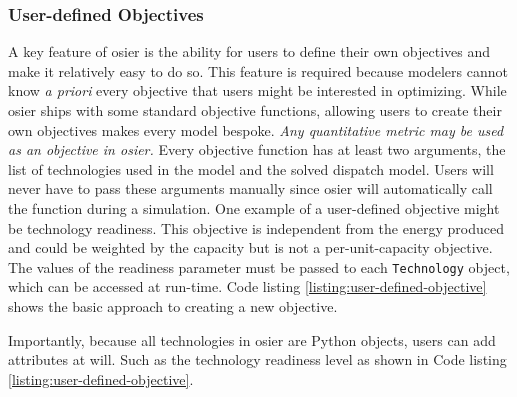 \subsubsection{User-defined Objectives}

A key feature of \ac{osier} is the ability for users to define their own
objectives and make it relatively easy to do so. This feature is required
because modelers cannot know \textit{a priori} every objective that users might
be interested in optimizing. While \ac{osier} ships with some standard objective
functions, allowing users to create their own objectives makes every model
bespoke. \textit{Any quantitative metric may be used as an objective in
\ac{osier}.} Every objective function has at least two arguments, the list of
technologies used in the model and the solved dispatch model. Users will never
have to pass these arguments manually since \ac{osier} will automatically call
the function during a simulation. One example of a user-defined objective might
be technology readiness. This objective is independent from the energy produced
and could be weighted by the capacity but is not a per-unit-capacity objective.
The values of the readiness parameter must be passed to each \texttt{Technology}
object, which can be accessed at run-time. Code listing
\ref{listing:user-defined-objective} shows the basic approach to creating a new
objective. 

\noindent
Importantly, because all technologies in \ac{osier} are Python objects, users
can add attributes at will. Such as the technology readiness level as shown in
Code listing \ref{listing:user-defined-objective}. 

